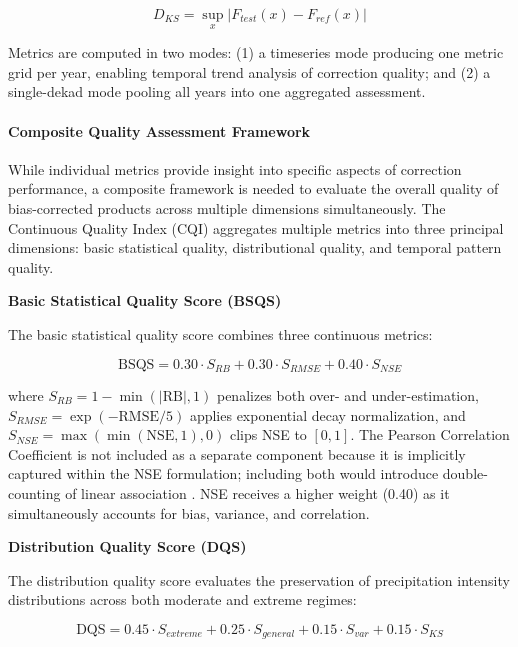 \documentclass[11pt,a4paper]{article}
\begin{document}
\begin{equation}D_{KS} = \sup_{x} |F_{test}(x) - F_{ref}(x)|\end{equation}

Metrics are computed in two modes: (1) a timeseries mode producing one
metric grid per year, enabling temporal trend analysis of correction
quality; and (2) a single-dekad mode pooling all years into one
aggregated assessment.

\paragraph{Composite Quality Assessment
Framework}\label{composite-quality-assessment-framework}

While individual metrics provide insight into specific aspects of
correction performance, a composite framework is needed to evaluate the
overall quality of bias-corrected products across multiple dimensions
simultaneously. The Continuous Quality Index (CQI) aggregates multiple
metrics into three principal dimensions: basic statistical quality,
distributional quality, and temporal pattern quality.

\textbf{Basic Statistical Quality Score (BSQS)}

The basic statistical quality score combines three continuous metrics:

\begin{equation}\text{BSQS} = 0.30 \cdot S_{RB} + 0.30 \cdot S_{RMSE} + 0.40 \cdot S_{NSE}\end{equation}

where \(S_{RB} = 1 - \min(|\text{RB}|, 1)\) penalizes both over- and
under-estimation, \(S_{RMSE} = \exp(-\text{RMSE}/5)\) applies
exponential decay normalization, and
\(S_{NSE} = \max(\min(\text{NSE}, 1), 0)\) clips NSE to \([0, 1]\). The
Pearson Correlation Coefficient is not included as a separate component
because it is implicitly captured within the NSE formulation; including
both would introduce double-counting of linear association \cite{ref30}. NSE
receives a higher weight (0.40) as it simultaneously accounts for bias,
variance, and correlation.

\textbf{Distribution Quality Score (DQS)}

The distribution quality score evaluates the preservation of
precipitation intensity distributions across both moderate and extreme
regimes:

\begin{equation}\text{DQS} = 0.45 \cdot S_{extreme} + 0.25 \cdot S_{general} + 0.15 \cdot S_{var} + 0.15 \cdot S_{KS}\end{equation}
\end{document}
